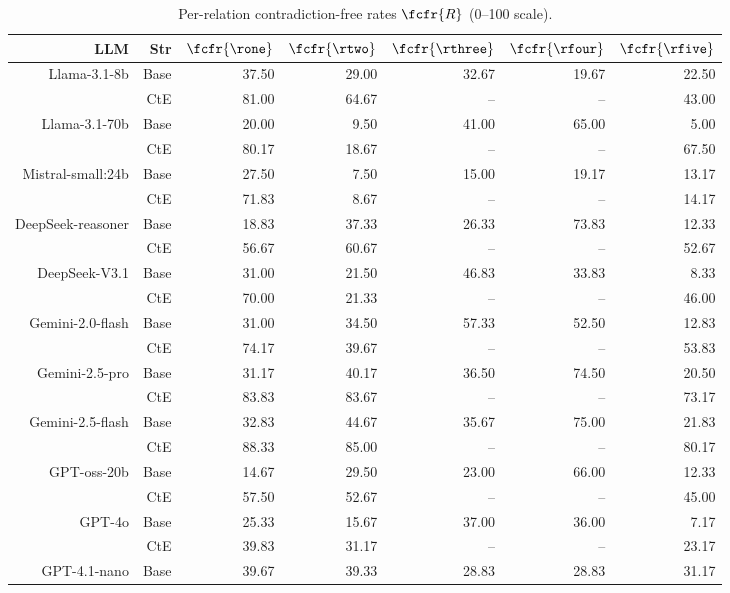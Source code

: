 \begin{table}[!t]
\caption{Per-relation contradiction-free rates $\fcfr{R}$ (0--100 scale). }
\centering
{}

\footnotesize
\begin{tabular}{r r !{\color{white!80!black} \vline} r r r r r}
\toprule
\textbf{LLM} & \textbf{Str} & $\fcfr{\rone}$ & $\fcfr{\rtwo}$ & $\fcfr{\rthree}$ & $\fcfr{\rfour}$ & $\fcfr{\rfive}$ \\
\midrule
\sf Llama-3.1-8b & Base & 37.50 & 29.00 & 32.67 & 19.67 & 22.50 \\
 & CtE & 81.00 & 64.67 & -- & -- & 43.00 \\
\midrule
\sf Llama-3.1-70b & Base & 20.00 & 9.50 & 41.00 & 65.00 & 5.00 \\
 & CtE & 80.17 & 18.67 & -- & -- & 67.50 \\
\midrule
\sf Mistral-small:24b & Base & 27.50 & 7.50 & 15.00 & 19.17 & 13.17 \\
 & CtE & 71.83 & 8.67 & -- & -- & 14.17 \\
\midrule
\sf DeepSeek-reasoner & Base & 18.83 & 37.33 & 26.33 & 73.83 & 12.33 \\
 & CtE & 56.67 & 60.67 & -- & -- & 52.67 \\
\midrule
\sf DeepSeek-V3.1 & Base & 31.00 & 21.50 & 46.83 & 33.83 & 8.33 \\
 & CtE & 70.00 & 21.33 & -- & -- & 46.00 \\
\midrule
\sf Gemini-2.0-flash & Base & 31.00 & 34.50 & 57.33 & 52.50 & 12.83 \\
 & CtE & 74.17 & 39.67 & -- & -- & 53.83 \\
\midrule
\sf Gemini-2.5-pro & Base & 31.17 & 40.17 & 36.50 & 74.50 & 20.50 \\
 & CtE & 83.83 & 83.67 & -- & -- & 73.17 \\
\midrule
\sf Gemini-2.5-flash & Base & 32.83 & 44.67 & 35.67 & 75.00 & 21.83 \\
 & CtE & 88.33 & 85.00 & -- & -- & 80.17 \\
\midrule
\sf GPT-oss-20b & Base & 14.67 & 29.50 & 23.00 & 66.00 & 12.33 \\
 & CtE & 57.50 & 52.67 & -- & -- & 45.00 \\
\midrule
\sf GPT-4o & Base & 25.33 & 15.67 & 37.00 & 36.00 & 7.17 \\
 & CtE & 39.83 & 31.17 & -- & -- & 23.17 \\
\midrule
\sf GPT-4.1-nano & Base & 39.67 & 39.33 & 28.83 & 28.83 & 31.17 \\

\end{tabular}
\end{table}
